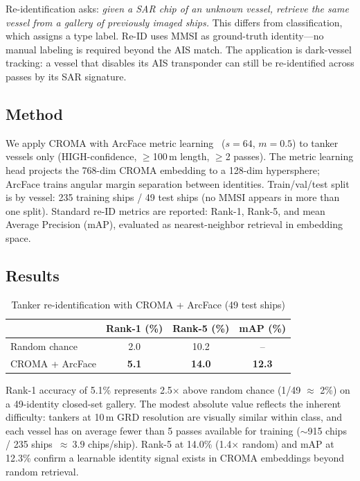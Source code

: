 \documentclass[journal]{IEEEtran}
\begin{document}
Re-identification asks: \textit{given a SAR chip of an unknown vessel,
retrieve the same vessel from a gallery of previously imaged ships.}
This differs from classification, which assigns a type label.
Re-ID uses MMSI as ground-truth identity---no manual labeling is required
beyond the AIS match.
The application is dark-vessel tracking: a vessel that disables its AIS
transponder can still be re-identified across passes by its SAR signature.

\subsection{Method}

We apply CROMA with ArcFace metric learning~\cite{deng2019}
($s\!=\!64$, $m\!=\!0.5$) to tanker vessels only (HIGH-confidence,
$\geq$100\,m length, $\geq$2 passes).
The metric learning head projects the 768-dim CROMA embedding to a
128-dim hypersphere; ArcFace trains angular margin separation between identities.
Train/val/test split is by vessel: 235 training ships / 49 test ships
(no MMSI appears in more than one split).
Standard re-ID metrics are reported: Rank-1, Rank-5, and mean Average
Precision (mAP), evaluated as nearest-neighbor retrieval in embedding space.

\subsection{Results}

\begin{table}[t]
\centering
\caption{Tanker re-identification with CROMA + ArcFace (49 test ships)}
\label{tab:reid}
\begin{tabular}{lccc}
\toprule
 & Rank-1 (\%) & Rank-5 (\%) & mAP (\%) \\
\midrule
Random chance    & 2.0  & 10.2 & --   \\
CROMA + ArcFace  & \textbf{5.1} & \textbf{14.0} & \textbf{12.3} \\
\bottomrule
\end{tabular}
\end{table}

Rank-1 accuracy of 5.1\% represents 2.5$\times$ above random chance
(1/49 $\approx$ 2\%) on a 49-identity closed-set gallery.
The modest absolute value reflects the inherent difficulty: tankers
at 10\,m GRD resolution are visually similar within class, and each
vessel has on average fewer than 5 passes available for training
($\sim$915 chips / 235 ships~$\approx~3.9$ chips/ship).
Rank-5 at 14.0\% (1.4$\times$ random) and mAP at 12.3\% confirm a
learnable identity signal exists in CROMA embeddings beyond random
retrieval.
\end{document}

